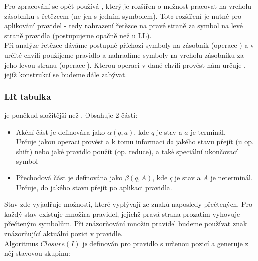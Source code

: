 Pro zpracování se opět používá , který je
rozšířen o možnost pracovat na vrcholu zásobníku s řetězcem (ne jen s jedním symbolem).
Toto rozšíření je nutné pro aplikování pravidel - tedy nahrazení řetězce na pravé straně za
symbol na levé straně pravidla (postupujeme opačně než u LL).\\

Při analýze řetězce dáváme postupně příchozí symboly na zásobník (operace )
a v určité chvíli použijeme pravidlo a nahradíme symboly na vrcholu zásobníku za
jeho levou stranu (operace ). Kterou operaci v dané chvíli provést
nám určuje , jejíž konstrukcí se budeme dále zabývat.\\

\subsubsection*{LR tabulka}

 je poněkud složitější než . Obsahuje 2 části:

\begin{itemize}
  \item Akční část je definována jako $\alpha(q, a)$, kde $q$ je stav a $a$ je terminál.\\
  Určuje jakou operaci provést a k tomu informaci
  do jakého stavu přejít (u op. shift) nebo jaké pravidlo použít (op. reduce), a také speciální
  ukončovací symbol
  \item Přechodová část je definována jako $\beta(q, A)$, kde $q$ je stav a $A$ je neterminál.\\
  Určuje, do jakého stavu přejít po aplikaci pravidla.
\end{itemize}

Stav zde vyjadřuje možnosti, které vyplývají ze znaků naposledy přečtených.
Pro každý stav existuje množina pravidel, jejichž pravá strana prozatím vyhovuje přečteným symbolům.
Při znázorňování množin pravidel budeme používat znak  znázorňující aktuální pozici v pravidle.\\

\noindent
Algoritmus $Closure(I)$ je definován pro pravidlo s určenou pozicí a generuje z něj stavovou skupinu:\\
\begin{algorithm}[H]
  \caption{$Closure(I)$}

  \BlankLine
\end{algorithm}
\vspace{0.5cm}

